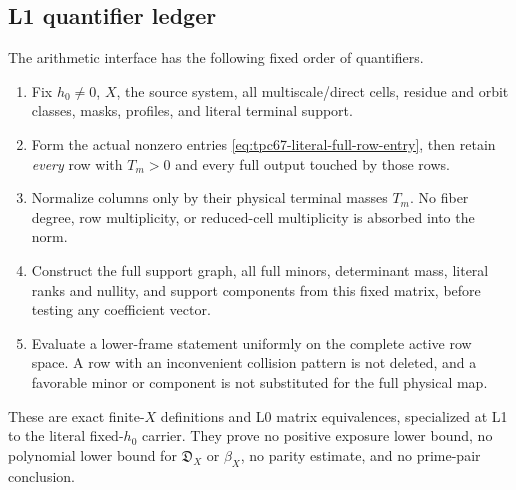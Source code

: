 \subsection{L1 quantifier ledger}
\label{subsec:tpc67-interface-ledger}

The arithmetic interface has the following fixed order of quantifiers.
\begin{enumerate}[label=\textup{(L1.\arabic*)},leftmargin=4em]
 \item Fix \(h_0\ne0\), \(X\), the source system, all multiscale/direct
       cells, residue and orbit classes, masks, profiles, and literal
       terminal support.
 \item Form the actual nonzero entries
       \eqref{eq:tpc67-literal-full-row-entry}, then retain
       \emph{every} row with \(T_m>0\) and every full output touched by
       those rows.
 \item Normalize columns only by their physical terminal masses \(T_m\).
       No fiber degree, row multiplicity, or reduced-cell multiplicity is
       absorbed into the norm.
 \item Construct the full support graph, all full minors, determinant
       mass, literal ranks and nullity, and support components from this fixed
       matrix, before testing any coefficient vector.
 \item Evaluate a lower-frame statement uniformly on the complete active
       row space.  A row with an inconvenient collision pattern is not
       deleted, and a favorable minor or component is not substituted for
       the full physical map.
\end{enumerate}

These are exact finite-\(X\) definitions and L0 matrix equivalences,
specialized at L1 to the literal fixed-\(h_0\) carrier.  They prove no
positive exposure lower bound, no polynomial lower bound for
\(\mathfrak D_X\) or \(\beta_X\), no parity estimate, and no prime-pair
conclusion.
